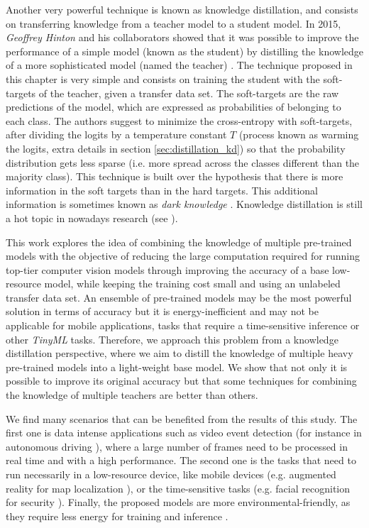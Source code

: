 Another very powerful technique is known as knowledge distillation, and consists on transferring knowledge from a teacher model to a student model. In 2015, \textit{Geoffrey Hinton} and his collaborators showed that it was possible to improve the performance of a simple model (known as the student) by distilling the knowledge of a more sophisticated model (named the teacher) \autocite{hinton2015}. The technique proposed in this chapter is very simple and consists on training the student with the soft-targets of the teacher, given a transfer data set. The soft-targets are the raw predictions of the model, which are expressed as probabilities of belonging to each class. The authors suggest to minimize the cross-entropy with soft-targets, after dividing the logits by a temperature constant $T$ (process known as warming the logits, extra details in section \ref{sec:distillation_kd}) so that the probability distribution gets less sparse (i.e. more spread across the classes different than the majority class). This technique is built over the hypothesis that there is more information in the soft targets than in the hard targets. This additional information is sometimes known as \textit{dark knowledge} \autocite{gou2020}. Knowledge distillation is still a hot topic in nowadays research (see \autocite{tan2021, zhao2021, lee2021}).


This work explores the idea of combining the knowledge of multiple pre-trained models with the objective of reducing the large computation required for running top-tier computer vision models through improving the accuracy of a base low-resource model, while keeping the training cost small and using an unlabeled transfer data set. 	An ensemble of pre-trained models may be the most powerful solution in terms of accuracy but it is energy-inefficient and may not be applicable for mobile applications, tasks that require a time-sensitive inference \autocite{sanchez2020} or other \textit{TinyML} tasks. Therefore, we approach this problem from a knowledge distillation perspective, where we aim to distill the knowledge of multiple heavy pre-trained models into a light-weight base model. We show that not only it is possible to improve its original accuracy but that some techniques for combining the knowledge of multiple teachers are better than others.

We find many scenarios that can be benefited from the results of this study. The first one is data intense applications such as video event detection \autocite{chakraborty2021} (for instance in autonomous driving \autocite{swaminathan2019}), where a large number of frames need to be processed in real time and with a high performance. The second one is the tasks that need to run necessarily in a low-resource device, like mobile devices (e.g. augmented reality for map localization \autocite{limmer2017}), or the time-sensitive tasks (e.g. facial recognition for security \autocite{aung2021}). Finally, the proposed models are more environmental-friendly, as they require less energy for training and inference \autocite{wu2022sustainable}.


